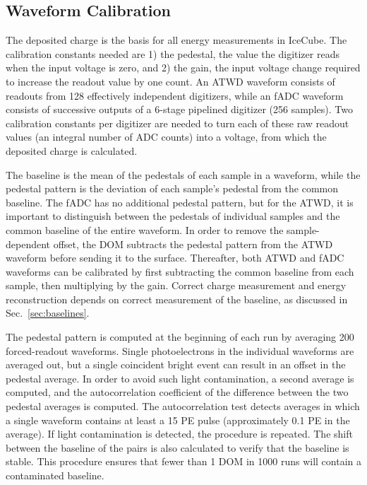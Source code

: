 \subsection{\label{sec:waveformcal}Waveform Calibration}

The deposited charge is the basis for all energy measurements in IceCube. The
calibration constants needed are 1) the pedestal, the value the digitizer
reads when the input voltage is zero, and 2) the gain, the input voltage change
required to increase the readout value by one count.  An ATWD waveform
consists of readouts from 128 effectively independent 
digitizers, while an fADC waveform consists of successive outputs of a 6-stage
pipelined digitizer (256 samples). Two calibration constants per digitizer are needed to turn each of these
raw readout values (an integral number of ADC counts) into a
voltage, from which the deposited charge is calculated.

The baseline is the mean of the pedestals of each sample in a waveform, while the pedestal pattern is
the deviation of each sample's pedestal from the common baseline.  The fADC
has no additional pedestal pattern, but for the ATWD, it is important to distinguish
between the pedestals of individual samples 
and the common baseline of the entire waveform.  In order to remove the
sample-dependent offset, the DOM subtracts the pedestal pattern from
the ATWD waveform before sending it to the surface.  Thereafter, both ATWD
and fADC waveforms can be calibrated by first subtracting the common
baseline from each sample, then multiplying by the gain. Correct charge
measurement and energy reconstruction depends on correct measurement
of the baseline, as discussed in Sec.~\ref{sec:baselines}.

The pedestal pattern is computed at the beginning of each 
run by averaging 200 forced-readout waveforms.  Single photoelectrons in
the individual waveforms are averaged out, but a single coincident bright event can
result in an offset in the pedestal average.  In order to avoid such
light contamination, a second average is computed, and the
autocorrelation coefficient of the difference between the two pedestal
averages is computed.  The autocorrelation test detects averages in which a
single waveform contains at least a 15 PE pulse (approximately 0.1 PE in the
average).  If light contamination is detected, the procedure is repeated.
The shift between the baseline of the pairs is also calculated to verify
that the baseline is stable.  This procedure ensures that fewer than 1 DOM
in 1000 runs will contain a contaminated baseline.

